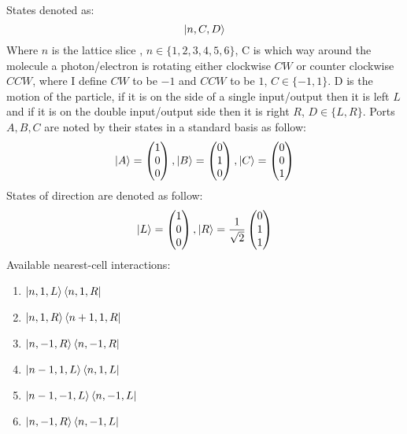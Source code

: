 \documentclass{article}
\begin{document}
\newpage
States denoted as:
$$ \ket{n, C, D} $$
Where $n$ is the lattice slice , $n \in \{1,2,3,4,5,6\}$, C is which way around the molecule a photon/electron is rotating either clockwise $CW$ or counter clockwise $CCW$, where I define $CW$ to be $-1$ and $CCW$ to be $1$, $C \in \{-1, 1\}$. D is the motion of the particle, if it is on the side of a single input/output then it is left $L$ and if it is on the double input/output side then it is right $R$, $D \in \{L, R\}$. \newline
Ports $A, B, C$ are noted by their states in a standard basis as follow: 
$$ \ket{A} = \begin{pmatrix} 
1 \\
0 \\
0
\end{pmatrix} ,
 \ket{B} = \begin{pmatrix} 
0 \\
1 \\
0
\end{pmatrix} ,
 \ket{C} = \begin{pmatrix} 
0 \\
0 \\
1
\end{pmatrix} 
$$
States of direction are denoted as follow:
$$ \ket{L} =  \begin{pmatrix} 
1 \\
0 \\
0
\end{pmatrix} , 
\ket{R} = \frac{1}{\sqrt{2}}\begin{pmatrix}
0 \\
1 \\
1
\end{pmatrix}
$$
Available nearest-cell interactions: \newline
\begin{enumerate}
    \item $\ket{n,1,L}\bra{n,1,R}$
    \item $\ket{n,1,R}\bra{n+1,1,R}$
    \item $\ket{n,-1,R}\bra{n,-1,R}$
    \item $\ket{n-1,1,L}\bra{n,1,L}$
    \item $\ket{n-1,-1,L}\bra{n,-1,L}$
    \item $\ket{n,-1,R}\bra{n,-1,L}$
\end{enumerate}
\end{document}
